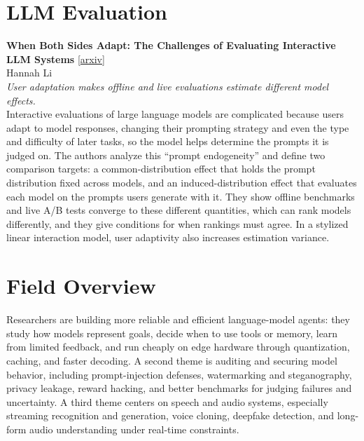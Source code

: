 \documentclass[12pt,letterpaper]{article}
\begin{document}
\medskip
\section*{LLM Evaluation}
\begin{minipage}{\linewidth}
{\small\textbf{When Both Sides Adapt: The Challenges of Evaluating Interactive LLM Systems}} {\scriptsize[\href{https://arxiv.org/abs/2611.17239}{arxiv}]}\\
{\scriptsize Hannah Li}\\
{\footnotesize\textit{User adaptation makes offline and live evaluations estimate different model effects.}}\\[2pt]
{\footnotesize Interactive evaluations of large language models are complicated because users adapt to model responses, changing their prompting strategy and even the type and difficulty of later tasks, so the model helps determine the prompts it is judged on. The authors analyze this ``prompt endogeneity'' and define two comparison targets: a common-distribution effect that holds the prompt distribution fixed across models, and an induced-distribution effect that evaluates each model on the prompts users generate with it. They show offline benchmarks and live A/B tests converge to these different quantities, which can rank models differently, and they give conditions for when rankings must agree. In a stylized linear interaction model, user adaptivity also increases estimation variance.}
\end{minipage}

\medskip
\section*{Field Overview}
{\footnotesize Researchers are building more reliable and efficient language-model agents: they study how models represent goals, decide when to use tools or memory, learn from limited feedback, and run cheaply on edge hardware through quantization, caching, and faster decoding. A second theme is auditing and securing model behavior, including prompt-injection defenses, watermarking and steganography, privacy leakage, reward hacking, and better benchmarks for judging failures and uncertainty. A third theme centers on speech and audio systems, especially streaming recognition and generation, voice cloning, deepfake detection, and long-form audio understanding under real-time constraints.}
\end{document}
